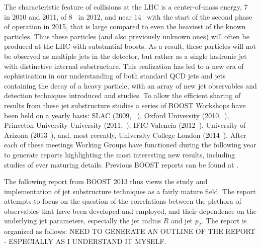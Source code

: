 The characteristic feature of collisions at the LHC is a center-of-mass energy, 7~\tev{} in 2010 and 2011, 
of 8~\tev{} in 2012, and near 14~\tev{} with the start of the second phase of operation in 2015, that is large
compared to even the heaviest of the known particles.  Thus these particles (and also previously unknown ones)
will often be produced at the LHC with
substantial boosts.  As a result, these particles will not be observed as multiple jets in the detector, but rather
as a single hadronic jet with distinctive internal substructure.  This realization has led to a new era of sophistication
in our understanding of  both standard QCD jets and jets containing the decay of a heavy particle, with an array
of new jet observables and detection techniques introduced and studies.  To allow the efficient sharing of 
results from these jet substructure studies a series of BOOST Workshops have been held on a yearly basis:
SLAC (2009, ~\cite{boost09}), 
Oxford University (2010,~\cite{boost10}), Princeton 
University University (2011,~\cite{boost11}),  IFIC Valencia (2012~\cite{boost12}), 
University of Arizona (2013~\cite{boost13}), and, most recently, University College London (2014~\cite{boost2014}).
After each of these meetings Working Groups have functioned during the following year to generate reports
highlighting the most interesting new results, including studies of ever maturing details.   Previous BOOST reports
can be found at \cite{Abdesselam:2010pt,Altheimer:2012mn,Altheimer:2013yza}.

The following report from BOOST 2013 thus views the study and implementation of jet substructure techniques as a fairly
mature field. The report attempts to focus on the question of the correlations between the plethora of observables that have been developed 
and employed, and their dependence on the underlying jet parameters, especially the jet radius $R$ and jet $p_T$.
The report is organized as follows:  NEED TO GENERATE AN OUTLINE OF THE REPORT - ESPECIALLY AS I UNDERSTAND IT
MYSELF.